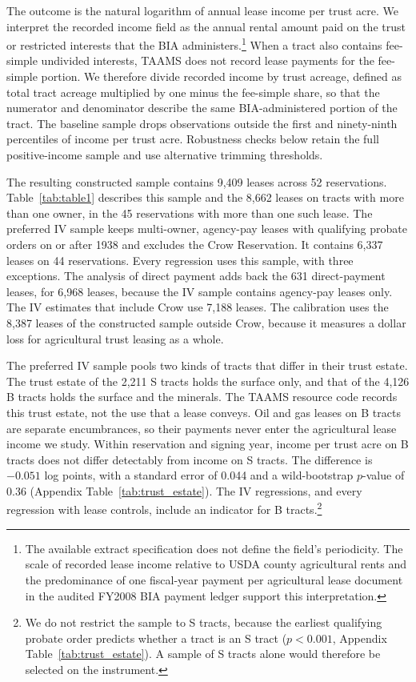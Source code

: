 \documentclass[12pt]{article}
\begin{document}
The outcome is the natural logarithm of annual lease income per trust acre. We interpret the recorded income field as the annual rental amount paid on the trust or restricted interests that the BIA administers.\footnote{The available extract specification does not define the field's periodicity. The scale of recorded lease income relative to USDA county agricultural rents and the predominance of one fiscal-year payment per agricultural lease document in the audited FY2008 BIA payment ledger support this interpretation.} When a tract also contains fee-simple undivided interests, TAAMS does not record lease payments for the fee-simple portion. We therefore divide recorded income by trust acreage, defined as total tract acreage multiplied by one minus the fee-simple share, so that the numerator and denominator describe the same BIA-administered portion of the tract. The baseline sample drops observations outside the first and ninety-ninth percentiles of income per trust acre. Robustness checks below retain the full positive-income sample and use alternative trimming thresholds.

The resulting constructed sample contains 9,409 leases across 52 reservations. Table~\ref{tab:table1} describes this sample and the 8,662 leases on tracts with more than one owner, in the 45 reservations with more than one such lease. The preferred IV sample keeps multi-owner, agency-pay leases with qualifying probate orders on or after 1938 and excludes the Crow Reservation. It contains 6,337 leases on 44 reservations. Every regression uses this sample, with three exceptions. The analysis of direct payment adds back the 631 direct-payment leases, for 6,968 leases, because the IV sample contains agency-pay leases only. The IV estimates that include Crow use 7,188 leases. The calibration uses the 8,387 leases of the constructed sample outside Crow, because it measures a dollar loss for agricultural trust leasing as a whole.

The preferred IV sample pools two kinds of tracts that differ in their trust estate. The trust estate of the 2,211 S tracts holds the surface only, and that of the 4,126 B tracts holds the surface and the minerals. The TAAMS resource code records this trust estate, not the use that a lease conveys. Oil and gas leases on B tracts are separate encumbrances, so their payments never enter the agricultural lease income we study. Within reservation and signing year, income per trust acre on B tracts does not differ detectably from income on S tracts. The difference is $-0.051$ log points, with a standard error of 0.044 and a wild-bootstrap $p$-value of 0.36 (Appendix Table~\ref{tab:trust_estate}). The IV regressions, and every regression with lease controls, include an indicator for B tracts.\footnote{We do not restrict the sample to S tracts, because the earliest qualifying probate order predicts whether a tract is an S tract ($p<0.001$, Appendix Table~\ref{tab:trust_estate}). A sample of S tracts alone would therefore be selected on the instrument.}
\end{document}
